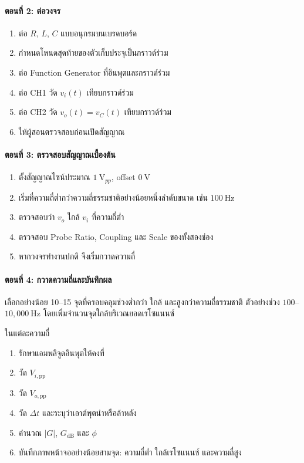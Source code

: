 \paragraph{ตอนที่ 2: ต่อวงจร}

\begin{enumerate}
    \item ต่อ $R$, $L$, $C$ แบบอนุกรมบนเบรดบอร์ด
    \item กำหนดโหนดสุดท้ายของตัวเก็บประจุเป็นกราวด์ร่วม
    \item ต่อ Function Generator ที่อินพุตและกราวด์ร่วม
    \item ต่อ CH1 วัด $v_i(t)$ เทียบกราวด์ร่วม
    \item ต่อ CH2 วัด $v_o(t)=v_C(t)$ เทียบกราวด์ร่วม
    \item ให้ผู้สอนตรวจสอบก่อนเปิดสัญญาณ
\end{enumerate}

\paragraph{ตอนที่ 3: ตรวจสอบสัญญาณเบื้องต้น}

\begin{enumerate}
    \item ตั้งสัญญาณไซน์ประมาณ $1\ \text{V}_{pp}$, offset $0\ \text{V}$
    \item เริ่มที่ความถี่ต่ำกว่าความถี่ธรรมชาติอย่างน้อยหนึ่งลำดับขนาด เช่น $100\ \text{Hz}$
    \item ตรวจสอบว่า $v_o$ ใกล้ $v_i$ ที่ความถี่ต่ำ
    \item ตรวจสอบ Probe Ratio, Coupling และ Scale ของทั้งสองช่อง
    \item หากวงจรทำงานปกติ จึงเริ่มกวาดความถี่
\end{enumerate}

\paragraph{ตอนที่ 4: กวาดความถี่และบันทึกผล}

เลือกอย่างน้อย 10–15 จุดที่ครอบคลุมช่วงต่ำกว่า ใกล้ และสูงกว่าความถี่ธรรมชาติ ตัวอย่างช่วง $100$–$10{,}000\ \text{Hz}$ โดยเพิ่มจำนวนจุดใกล้บริเวณยอดเรโซแนนซ์

ในแต่ละความถี่

\begin{enumerate}
    \item รักษาแอมพลิจูดอินพุตให้คงที่
    \item วัด $V_{i,\text{pp}}$
    \item วัด $V_{o,\text{pp}}$
    \item วัด $\Delta t$ และระบุว่าเอาต์พุตนำหรือล้าหลัง
    \item คำนวณ $|G|$, $G_{\text{dB}}$ และ $\phi$
    \item บันทึกภาพหน้าจออย่างน้อยสามจุด: ความถี่ต่ำ ใกล้เรโซแนนซ์ และความถี่สูง
\end{enumerate}

